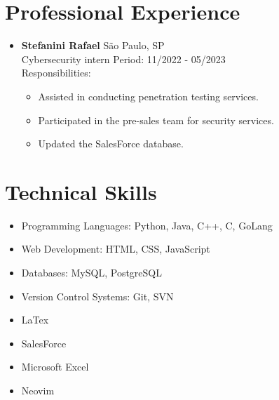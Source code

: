 \documentclass[a4paper,10pt]{article}
\begin{document}
\section*{Professional Experience}
\begin{itemize}[leftmargin=*]
    \item \textbf{Stefanini Rafael} \hfill São Paulo, SP \\
    Cybersecurity intern \hfill Period: 11/2022 - 05/2023 \\
     Responsibilities:
    \begin{itemize}
        \item Assisted in conducting penetration testing services.
        \item Participated in the pre-sales team for security services.
        \item Updated the SalesForce database.
    \end{itemize}    
\end{itemize}

\section*{Technical Skills}
\begin{itemize}[leftmargin=*]
    \item Programming Languages: Python, Java, C++, C, GoLang
    \item Web Development: HTML, CSS, JavaScript
    \item Databases: MySQL, PostgreSQL
    \item Version Control Systems: Git, SVN
    \item LaTex
    \item SalesForce
    \item Microsoft Excel
    \item Neovim    
\end{itemize}

\end{document}
